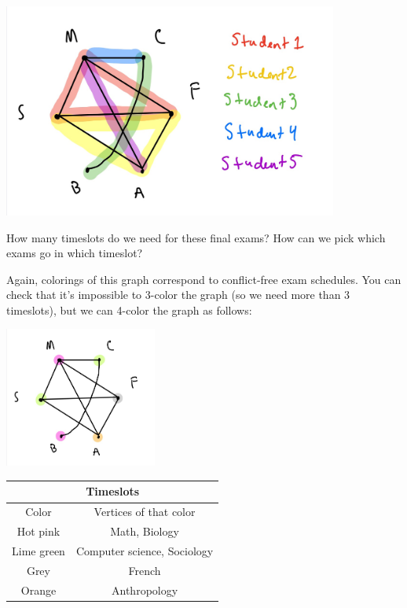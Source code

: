 \begin{center}
\includegraphics[width=11cm]{pics/final-conflicts.jpeg}
\end{center}

\begin{question}{}
How many timeslots do we need for these final exams? How can we pick which exams go in which timeslot?
\end{question}

Again, colorings of this graph correspond to conflict-free exam schedules. You can check that it's impossible to 3-color the graph (so we need more than 3 timeslots), but we can 4-color the graph as follows: 

\begin{center}
\includegraphics[width=5cm]{pics/final-coloring.jpeg}
\begin{tabular}{c|c}
 \multicolumn{2}{c}{Timeslots}\\
\hline
 Color & Vertices of that color \\
 \hline
 \hline
Hot pink & Math, Biology\\
 \hline
  Lime green & Computer science, Sociology \\
 \hline
 Grey & French \\
 \hline
 Orange & Anthropology
 \end{tabular}
 \end{center}
 
